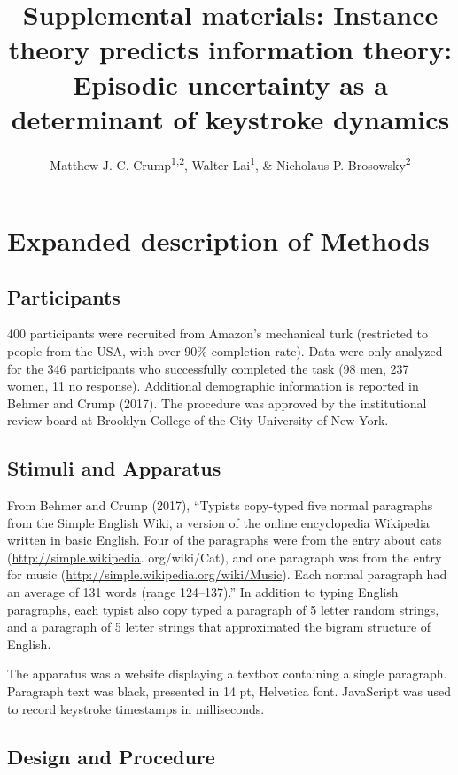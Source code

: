 \documentclass[,man,floatsintext]{apa6}
\title{Supplemental materials: Instance theory predicts information theory: Episodic uncertainty as a determinant of keystroke dynamics}
\author{Matthew J. C. Crump\textsuperscript{1,2}, Walter Lai\textsuperscript{1}, \& Nicholaus P. Brosowsky\textsuperscript{2}}
\date{}
\affiliation{
\vspace{0.5cm}
\textsuperscript{1} Brooklyn College of the City University of New York\\\textsuperscript{2} The Graduate Center of the City University of New York}
\begin{document}
\maketitle

\hypertarget{expanded-description-of-methods}{%
\section{Expanded description of Methods}\label{expanded-description-of-methods}}

\hypertarget{participants}{%
\subsection{Participants}\label{participants}}

400 participants were recruited from Amazon's mechanical turk (restricted to people from the USA, with over 90\% completion rate). Data were only analyzed for the 346 participants who successfully completed the task (98 men, 237 women, 11 no response). Additional demographic information is reported in Behmer and Crump (2017). The procedure was approved by the institutional review board at Brooklyn College of the City University of New York.

\hypertarget{stimuli-and-apparatus}{%
\subsection{Stimuli and Apparatus}\label{stimuli-and-apparatus}}

From Behmer and Crump (2017), \enquote{Typists copy-typed five normal paragraphs from the Simple English Wiki, a version of the online encyclopedia Wikipedia written in basic English. Four of the paragraphs were from the entry about cats (\url{http://simple.wikipedia}. org/wiki/Cat), and one paragraph was from the entry for music (\url{http://simple.wikipedia.org/wiki/Music}). Each normal paragraph had an average of 131 words (range 124--137).} In addition to typing English paragraphs, each typist also copy typed a paragraph of 5 letter random strings, and a paragraph of 5 letter strings that approximated the bigram structure of English.

The apparatus was a website displaying a textbox containing a single paragraph. Paragraph text was black, presented in 14 pt, Helvetica font. JavaScript was used to record keystroke timestamps in milliseconds.

\hypertarget{design-and-procedure}{%
\subsection{Design and Procedure}\label{design-and-procedure}}
\end{document}
